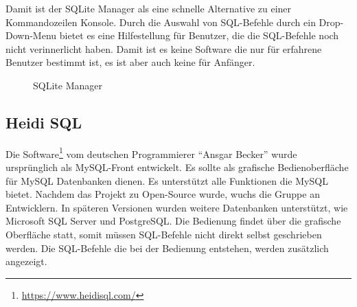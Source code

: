 Damit ist der SQLite Manager als eine schnelle Alternative zu einer Kommandozeilen Konsole. Durch die Auswahl von SQL-Befehle durch ein Drop-Down-Menu bietet es eine Hilfestellung für Benutzer, die die SQL-Befehle noch nicht verinnerlicht haben. Damit ist es keine Software die nur für erfahrene Benutzer bestimmt ist, es ist aber auch keine für Anfänger.
\begin{figure}[ht]
        \centering
        \caption{SQLite Manager}
        \label{pic:sqlite_manager}
\end{figure}

\subsection{Heidi SQL}
\label{sec02:heidi_sql}
Die Software\footnote{\url{https://www.heidisql.com/}} vom deutschen Programmierer ``Ansgar Becker'' wurde ursprünglich als MySQL-Front entwickelt. Es sollte als grafische Bedienoberfläche für MySQL Datenbanken dienen. Es unterstützt alle Funktionen die MySQL bietet. Nachdem das Projekt zu Open-Source wurde, wuchs die Gruppe an Entwicklern. In späteren Versionen wurden weitere Datenbanken unterstützt, wie Microsoft SQL Server und PostgreSQL.
Die Bedienung findet über die grafische Oberfläche statt, somit müssen SQL-Befehle nicht direkt selbst geschrieben werden. Die SQL-Befehle die bei der Bedienung entstehen, werden zusätzlich angezeigt.  

